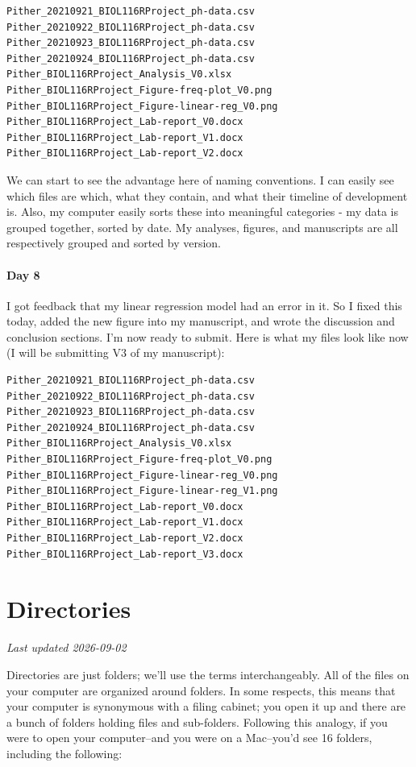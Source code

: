 \documentclass[
]{book}
\begin{document}
\begin{verbatim}
Pither_20210921_BIOL116RProject_ph-data.csv
Pither_20210922_BIOL116RProject_ph-data.csv
Pither_20210923_BIOL116RProject_ph-data.csv
Pither_20210924_BIOL116RProject_ph-data.csv
Pither_BIOL116RProject_Analysis_V0.xlsx
Pither_BIOL116RProject_Figure-freq-plot_V0.png
Pither_BIOL116RProject_Figure-linear-reg_V0.png
Pither_BIOL116RProject_Lab-report_V0.docx
Pither_BIOL116RProject_Lab-report_V1.docx
Pither_BIOL116RProject_Lab-report_V2.docx
\end{verbatim}

We can start to see the advantage here of naming conventions. I can easily see which files are which, what they contain, and what their timeline of development is. Also, my computer easily sorts these into meaningful categories - my data is grouped together, sorted by date. My analyses, figures, and manuscripts are all respectively grouped and sorted by version.

\subsubsection*{Day 8}\label{day-8}

I got feedback that my linear regression model had an error in it. So I fixed this today, added the new figure into my manuscript, and wrote the discussion and conclusion sections. I'm now ready to submit. Here is what my files look like now (I will be submitting V3 of my manuscript):

\begin{verbatim}
Pither_20210921_BIOL116RProject_ph-data.csv
Pither_20210922_BIOL116RProject_ph-data.csv
Pither_20210923_BIOL116RProject_ph-data.csv
Pither_20210924_BIOL116RProject_ph-data.csv
Pither_BIOL116RProject_Analysis_V0.xlsx
Pither_BIOL116RProject_Figure-freq-plot_V0.png
Pither_BIOL116RProject_Figure-linear-reg_V0.png
Pither_BIOL116RProject_Figure-linear-reg_V1.png
Pither_BIOL116RProject_Lab-report_V0.docx
Pither_BIOL116RProject_Lab-report_V1.docx
Pither_BIOL116RProject_Lab-report_V2.docx
Pither_BIOL116RProject_Lab-report_V3.docx
\end{verbatim}

\chapter{Directories}\label{directories}

\emph{Last updated 2026-09-02}

Directories are just folders; we'll use the terms interchangeably. All of the files on your computer are organized around folders. In some respects, this means that your computer is synonymous with a filing cabinet; you open it up and there are a bunch of folders holding files and sub-folders. Following this analogy, if you were to open your computer--and you were on a Mac--you'd see 16 folders, including the following:
\end{document}
